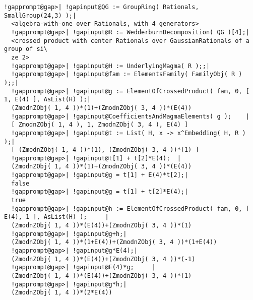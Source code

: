 \documentclass[a4paper,11pt]{report}
\begin{document}
{{{\begin{Verbatim}[commandchars=!@|,fontsize=\small,frame=single,label=Example]
  !gapprompt@gap>| !gapinput@QG := GroupRing( Rationals, SmallGroup(24,3) );|
  <algebra-with-one over Rationals, with 4 generators>
  !gapprompt@gap>| !gapinput@R := WedderburnDecomposition( QG )[4];|
  <crossed product with center Rationals over GaussianRationals of a group of si\
  ze 2>
  !gapprompt@gap>| !gapinput@H := UnderlyingMagma( R );;|
  !gapprompt@gap>| !gapinput@fam := ElementsFamily( FamilyObj( R ) );;|
  !gapprompt@gap>| !gapinput@g := ElementOfCrossedProduct( fam, 0, [ 1, E(4) ], AsList(H) );|
  (ZmodnZObj( 1, 4 ))*(1)+(ZmodnZObj( 3, 4 ))*(E(4))
  !gapprompt@gap>| !gapinput@CoefficientsAndMagmaElements( g );    |
  [ ZmodnZObj( 1, 4 ), 1, ZmodnZObj( 3, 4 ), E(4) ]
  !gapprompt@gap>| !gapinput@t := List( H, x -> x^Embedding( H, R ) );|
  [ (ZmodnZObj( 1, 4 ))*(1), (ZmodnZObj( 3, 4 ))*(1) ]
  !gapprompt@gap>| !gapinput@t[1] + t[2]*E(4);  |
  (ZmodnZObj( 1, 4 ))*(1)+(ZmodnZObj( 3, 4 ))*(E(4))
  !gapprompt@gap>| !gapinput@g = t[1] + E(4)*t[2];|
  false
  !gapprompt@gap>| !gapinput@g = t[1] + t[2]*E(4);|
  true
  !gapprompt@gap>| !gapinput@h := ElementOfCrossedProduct( fam, 0, [ E(4), 1 ], AsList(H) );     |
  (ZmodnZObj( 1, 4 ))*(E(4))+(ZmodnZObj( 3, 4 ))*(1)
  !gapprompt@gap>| !gapinput@g+h;|
  (ZmodnZObj( 1, 4 ))*(1+E(4))+(ZmodnZObj( 3, 4 ))*(1+E(4))
  !gapprompt@gap>| !gapinput@g*E(4);|
  (ZmodnZObj( 1, 4 ))*(E(4))+(ZmodnZObj( 3, 4 ))*(-1)
  !gapprompt@gap>| !gapinput@E(4)*g;     |
  (ZmodnZObj( 1, 4 ))*(E(4))+(ZmodnZObj( 3, 4 ))*(1)
  !gapprompt@gap>| !gapinput@g*h;|
  (ZmodnZObj( 1, 4 ))*(2*E(4))
  
\end{Verbatim}
 }

 }

 }

  
\end{document}
